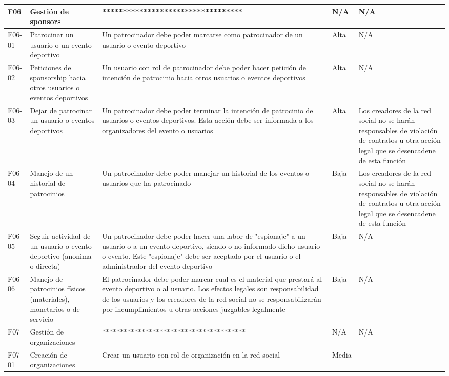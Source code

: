 \begin{table}[!htb]
\begin{center}
\begin{supertabular}{|p{1cm}|p{4cm}|p{4cm}|p{2cm}|p{4cm}|}
			\hline
			F06 & 
			Gestión de sponsors & 
			********************************** & 
			N/A & 
			N/A \\
			\hline
			F06-01 & 
			Patrocinar un usuario o un evento deportivo & 
			Un patrocinador debe poder marcarse como patrocinador de un usuario o evento deportivo & 
			Alta & 
			N/A \\
			\hline
			F06-02 & 
			Peticiones de sponsorship hacia otros usuarios o eventos deportivos & 
			Un usuario con rol de patrocinador debe poder hacer petición de intención de patrocinio hacia otros usuarios o eventos deportivos & 
			Alta & 
			N/A \\
			\hline
			F06-03 & 
			Dejar de patrocinar un usuario o eventos deportivos & 
			Un patrocinador debe poder terminar la intención de patrocinio de usuarios o eventos deportivos. Esta acción debe ser informada a los organizadores del evento o usuarios & 
			Alta & 
			Los creadores de la red social no se harán responsables de violación de contratos
u otra acción legal que se desencadene de esta función \\
			\hline
			F06-04 & 
			Manejo de un historial de patrocinios & 
			Un patrocinador debe poder manejar un historial de los eventos o usuarios que ha patrocinado & 
			Baja & 
			Los creadores de la red social no se harán responsables de violación de contratos
u otra acción legal que se desencadene de esta función \\
			\hline
			F06-05 & 
			Seguir actividad de un usuario o evento deportivo (anonima o directa) & 
			Un patrocinador debe poder hacer una labor de "espionaje" a un usuario o a un evento
deportivo, siendo o no informado dicho usuario o evento. Este "espionaje" debe ser aceptado por el usuario o el administrador del evento deportivo & 
			Baja & 
			N/A \\
			\hline
			F06-06 & 
			Manejo de patrocinios físicos (materiales), monetarios o de servicio & 
			El patrocinador debe poder marcar cual es el material que prestará al evento deportivo o al usuario. Los efectos legales son responsabilidad de los usuarios y los creadores de la red social no se responsabilizarán por incumplimientos u otras acciones juzgables legalmente &
			Baja & 
			N/A \\
			\hline
			F07 & 
			Gestión de organizaciones & 
			**************************************** &
			N/A & 
			N/A \\
			\hline
			\hline
			F07-01 & 
			Creación de organizaciones& 
			Crear un usuario con rol de organización en la red social &
			Media & 

\end{supertabular}
\end{center}
\end{table}
